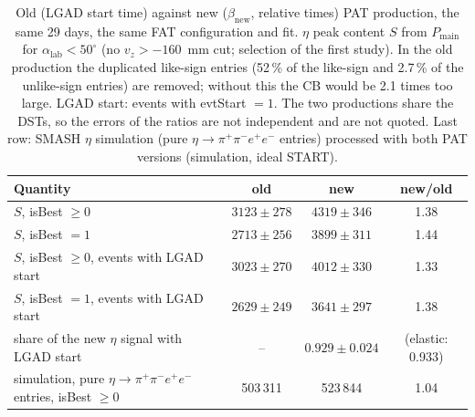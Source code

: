 \begin{table}[H]
\centering\small
\setlength{\tabcolsep}{4pt}
\caption{Old (LGAD start time) against new ($\beta_\mathrm{new}$, relative times) PAT production, the same 29 days, the same FAT configuration and fit.
$\eta$ peak content $S$ from $P_\mathrm{main}$ for $\alpha_\mathrm{lab}<50^\circ$ (no $v_z>-160$~mm cut; selection of the first study).
In the old production the duplicated like-sign entries (52\,\% of the like-sign and 2.7\,\% of the unlike-sign entries) are removed; without this the CB would be 2.1 times too large.
LGAD start: events with evtStart $=1$. The two productions share the DSTs, so the errors of the ratios are not independent and are not quoted.
Last row: SMASH $\eta$ simulation (pure $\eta\to\pi^+\pi^-e^+e^-$ entries) processed with both PAT versions (simulation, ideal START).}
\label{tab:res_oldnew}
\begin{tabular}{lccc}
\toprule
Quantity & old & new & new/old \\
\midrule
$S$, isBest $\geq0$ & $3123\pm278$ & $4319\pm346$ & 1.38 \\
$S$, isBest $=1$ & $2713\pm256$ & $3899\pm311$ & 1.44 \\
$S$, isBest $\geq0$, events with LGAD start & $3023\pm270$ & $4012\pm330$ & 1.33 \\
$S$, isBest $=1$, events with LGAD start & $2629\pm249$ & $3641\pm297$ & 1.38 \\
share of the new $\eta$ signal with LGAD start & -- & $0.929\pm0.024$ & (elastic: 0.933) \\
\midrule
simulation, pure $\eta\to\pi^+\pi^-e^+e^-$ entries, isBest $\geq0$ & 503\,311 & 523\,844 & 1.04 \\
\bottomrule
\end{tabular}
\end{table}
